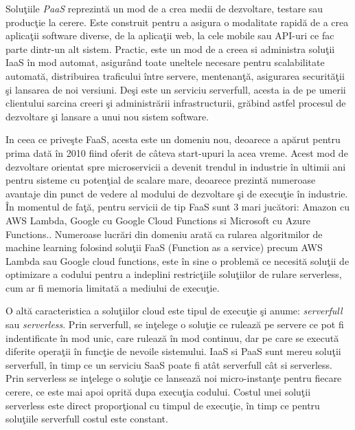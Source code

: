 \documentclass[a4paper,12pt]{report}
\begin{document}
\par Soluţiile \emph{PaaS} reprezintă un mod de a crea medii de dezvoltare, testare sau producţie la cerere. Este construit pentru a asigura o modalitate rapidă de a crea aplicaţii software diverse, de la aplicaţii web, la cele mobile sau API-uri ce fac parte dintr-un alt sistem. Practic, este un mod de a creea si administra soluţii IaaS în mod automat, asigurând toate uneltele necesare pentru scalabilitate automată, distribuirea traficului între servere, mentenanţă, asigurarea securităţii şi lansarea de noi versiuni. Deşi este un serviciu serverfull, acesta ia de pe umerii clientului sarcina creeri şi administrării infrastructurii, grăbind astfel procesul de dezvoltare şi lansare a unui nou sistem software.

\par In ceea ce priveşte FaaS, acesta este un domeniu nou, deoarece a apărut pentru prima dată în 2010 fiind oferit de câteva start-upuri la acea vreme. Acest mod de dezvoltare orientat spre microservicii a devenit trendul in industrie în ultimii ani pentru sisteme cu potenţial de scalare mare, deoarece prezintă numeroase avantaje din punct de vedere al modului de dezvoltare şi de execuţie în industrie. În momentul de faţă, pentru servicii de tip FaaS sunt 3 mari jucători: Amazon cu AWS Lambda, Google cu Google Cloud Functions si Microsoft cu Azure Functions.\cite{jonas2019cloud}. Numeroase lucrări din domeniu \cite{christidis2019, wang2019} arată ca rularea algoritmilor de machine learning folosind soluţii FaaS (Function as a service) precum AWS Lambda sau Google cloud functions, este în sine o problemă ce necesită soluţii de optimizare a codului pentru a indeplini restricţiile soluţiilor de rulare serverless, cum ar fi memoria limitată a mediului de execuţie. 
\par 
O altă caracteristica a soluţiilor cloud este tipul de execuţie şi anume: \emph{serverfull} sau \emph{serverless}.
Prin serverfull, se inţelege o soluţie ce rulează pe servere ce pot fi indentificate în mod unic, care rulează în mod continuu, dar pe care se execută diferite operaţii în funcţie de nevoile sistemului. IaaS si PaaS sunt mereu soluţii serverfull, în timp ce un serviciu SaaS poate fi atât serverfull cât si serverless.
Prin serverless se inţelege o soluţie ce lansează noi micro-instanţe pentru fiecare cerere, ce este mai apoi oprită dupa execuţia codului. Costul unei soluţii serverless este direct proporţional cu timpul de execuţie, în timp ce pentru soluţiile serverfull costul este constant. \\
\end{document}

